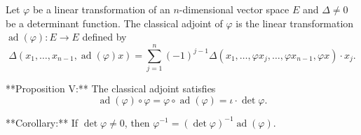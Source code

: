 Let $\varphi$ be a linear transformation of an $n$-dimensional vector space $E$ and $\Delta \neq 0$ be a determinant function. The classical adjoint of $\varphi$ is the linear transformation $\operatorname{ad}(\varphi): E \to E$ defined by
$$\Delta(x_1, \ldots, x_{n-1}, \operatorname{ad}(\varphi) x) = \sum_{j=1}^{n} (-1)^{j-1} \Delta(x_1, \ldots, \varphi x_j, \ldots, \varphi x_{n-1}, \varphi x) \cdot x_j.$$

**Proposition V:** The classical adjoint satisfies
$$\operatorname{ad}(\varphi) \circ \varphi = \varphi \circ \operatorname{ad}(\varphi) = \iota \cdot \det \varphi.$$

**Corollary:** If $\det \varphi \neq 0$, then $\varphi^{-1} = (\det \varphi)^{-1} \operatorname{ad}(\varphi)$.
